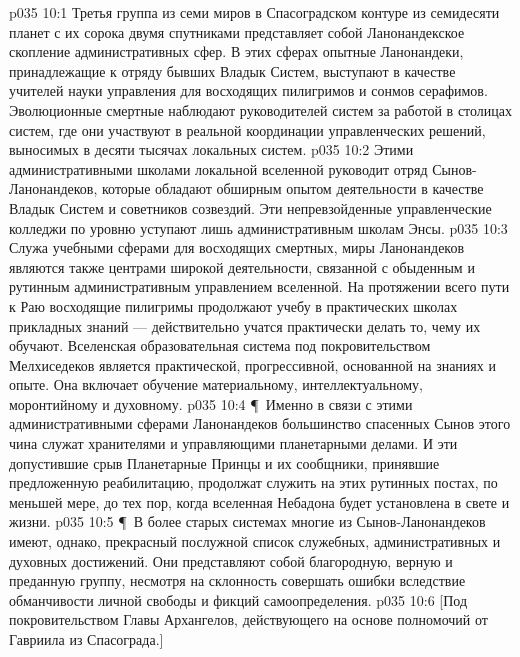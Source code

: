 \vs p035 10:1 Третья группа из семи миров в Спасоградском контуре из семидесяти планет с их сорока двумя спутниками представляет собой Ланонандекское скопление административных сфер. В этих сферах опытные Ланонандеки, принадлежащие к отряду бывших Владык Систем, выступают в качестве учителей науки управления для восходящих пилигримов и сонмов серафимов. Эволюционные смертные наблюдают руководителей систем за работой в столицах систем, где они участвуют в реальной координации управленческих решений, выносимых в десяти тысячах локальных систем.
\vs p035 10:2 Этими административными школами локальной вселенной руководит отряд Сынов\hyp{}Ланонандеков, которые обладают обширным опытом деятельности в качестве Владык Систем и советников созвездий. Эти непревзойденные управленческие колледжи по уровню уступают лишь административным школам Энсы.
\vs p035 10:3 Служа учебными сферами для восходящих смертных, миры Ланонандеков являются также центрами широкой деятельности, связанной с обыденным и рутинным административным управлением вселенной. На протяжении всего пути к Раю восходящие пилигримы продолжают учебу в практических школах прикладных знаний --- действительно учатся практически делать то, чему их обучают. Вселенская образовательная система под покровительством Мелхиседеков является практической, прогрессивной, основанной на знаниях и опыте. Она включает обучение материальному, интеллектуальному, моронтийному и духовному.
\vs p035 10:4 \P\ Именно в связи с этими административными сферами Ланонандеков большинство спасенных Сынов этого чина служат хранителями и управляющими планетарными делами. И эти допустившие срыв Планетарные Принцы и их сообщники, принявшие предложенную реабилитацию, продолжат служить на этих рутинных постах, по меньшей мере, до тех пор, когда вселенная Небадона будет установлена в свете и жизни.
\vs p035 10:5 \P\ В более старых системах многие из Сынов\hyp{}Ланонандеков имеют, однако, прекрасный послужной список служебных, административных и духовных достижений. Они представляют собой благородную, верную и преданную группу, несмотря на склонность совершать ошибки вследствие обманчивости личной свободы и фикций самоопределения.
\vs p035 10:6 [Под покровительством Главы Архангелов, действующего на основе полномочий от Гавриила из Спасограда.]
